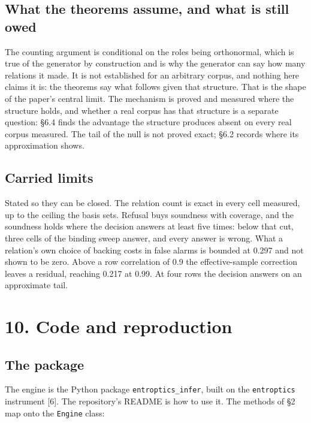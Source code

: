\documentclass[10pt,letterpaper,twocolumn]{article}
\begin{document}
\subsection{What the theorems assume, and what is still owed}\label{what-the-theorems-assume-and-what-is-still-owed}

The counting argument is conditional on the roles being orthonormal, which is true of the generator
by construction and is why the generator can say how many relations it made. It is not established
for an arbitrary corpus, and nothing here claims it is: the theorems say what follows given that
structure. That is the shape of the paper's central limit. The mechanism is proved and measured where
the structure holds, and whether a real corpus has that structure is a separate question: §6.4 finds
the advantage the structure produces absent on every real corpus measured. The tail of the null is not proved exact; §6.2
records where its approximation shows.

\subsection{Carried limits}\label{carried-limits}

Stated so they can be closed. The relation count is exact in every cell measured, up to the ceiling the
basis sets. Refusal
buys soundness with coverage, and the soundness holds where the decision answers at least five
times: below that cut, three cells of the binding sweep answer, and every answer is wrong. What a
relation's own choice of backing costs in false alarms is bounded at 0.297 and not shown to be zero. Above a row correlation of
0.9 the effective-sample correction leaves a residual, reaching 0.217 at 0.99. At four rows the
decision answers on an approximate tail.

\section{10. Code and reproduction}\label{10-code-and-reproduction}

\subsection{The package}\label{the-package}

The engine is the Python package \texttt{entroptics\_\allowbreak{}infer}, built on the \texttt{entroptics} instrument {[}6{]}.
The repository's README is how to use it. The methods of §2 map onto the \texttt{Engine} class:
\end{document}
